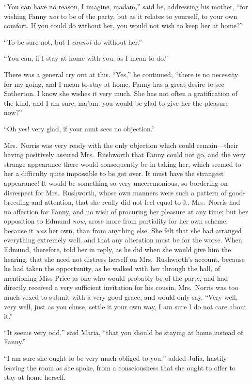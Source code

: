 \documentclass{article}
\begin{document}
``You can have no reason, I imagine, madam,'' said he,
addressing his mother, ``for wishing Fanny \emph{not}
to be of the party, but as it relates to yourself,
to your own comfort.  If you could do without her,
you would not wish to keep her at home?''

``To be sure not, but I \emph{cannot} do without her.''

``You can, if I stay at home with you, as I mean to do.''

There was a general cry out at this.  ``Yes,'' he continued,
``there is no necessity for my going, and I mean to stay
at home.  Fanny has a great desire to see Sotherton.
I know she wishes it very much.  She has not often a
gratification of the kind, and I am sure, ma'am, you would
be glad to give her the pleasure now?''

``Oh yes! very glad, if your aunt sees no objection.''

Mrs.\ Norris was very ready with the only objection which
could remain---their having positively assured Mrs.\ Rushworth
that Fanny could not go, and the very strange appearance
there would consequently be in taking her, which seemed
to her a difficulty quite impossible to be got over.
It must have the strangest appearance!  It would be
something so very unceremonious, so bordering on disrespect
for Mrs.\ Rushworth, whose own manners were such a pattern
of good-breeding and attention, that she really did not
feel equal to it.  Mrs.\ Norris had no affection for Fanny,
and no wish of procuring her pleasure at any time;
but her opposition to Edmund \emph{now}, arose more from
partiality for her own scheme, because it \emph{was} her own,
than from anything else.  She felt that she had arranged
everything extremely well, and that any alteration must be
for the worse.  When Edmund, therefore, told her in reply,
as he did when she would give him the hearing, that she
need not distress herself on Mrs.\ Rushworth's account,
because he had taken the opportunity, as he walked with
her through the hall, of mentioning Miss Price as one
who would probably be of the party, and had directly
received a very sufficient invitation for his cousin,
Mrs.\ Norris was too much vexed to submit with a very
good grace, and would only say, ``Very well, very well,
just as you chuse, settle it your own way, I am sure I
do not care about it.''

``It seems very odd,'' said Maria, ``that you should be
staying at home instead of Fanny.''

``I am sure she ought to be very much obliged to you,''
added Julia, hastily leaving the room as she spoke,
from a consciousness that she ought to offer to stay at
home herself.
\end{document}
